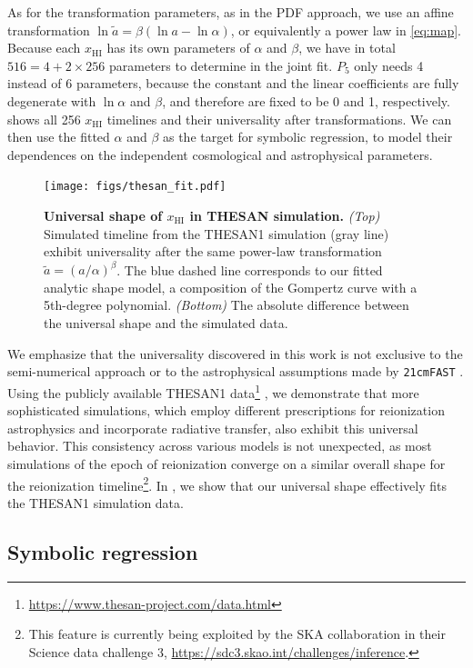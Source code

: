 \documentclass[12pt, a4paper]{article}
\newcommand{\HI}{\mathrm{HI}}
\newcommand{\ap}{\alpha}
\newcommand{\tilt}{\beta}
\newcommand{\ar}{\tilde{a}}
\begin{document}
As for the transformation parameters, as in the PDF approach, we use an
affine transformation $\ln\ar = \tilt (\ln a - \ln\ap)$, or equivalently
a power law in \cref{eq:map}.
Because each $x_\HI$ has its own parameters of $\ap$ and $\tilt$, we
have in total $516 = 4 + 2 \times 256$ parameters to determine in the
joint fit.
$P_5$ only needs 4 instead of 6 parameters, because the constant and the
linear coefficients are fully degenerate with $\ln\ap$ and $\tilt$, and
therefore are fixed to be 0 and 1, respectively.
 shows all 256 $x_\HI$ timelines and their universality
after transformations.
We can then use the fitted $\ap$ and $\tilt$ as the target for symbolic
regression, to model their dependences on the independent cosmological
and astrophysical parameters.

\begin{figure}[tb]
\centering
\texttt{[image: figs/thesan\_fit.pdf]}
\caption{\textbf{Universal shape of $x_\HI$ in THESAN simulation.} 
\emph{(Top)} Simulated timeline from the THESAN1 simulation (gray line) 
exhibit universality after the same power-law transformation 
$\tilde{a} = (a / \alpha)^\beta$. The blue dashed line corresponds to our
fitted analytic shape model, a composition of the Gompertz curve
with a 5th-degree polynomial. \emph{(Bottom)} The absolute difference
between the universal shape and the simulated data. }
\label{fig:thesan}
\end{figure}

We emphasize that the universality discovered in this work is not exclusive
to the semi-numerical approach or to the astrophysical
assumptions made by \texttt{21cmFAST} . Using the publicly available
THESAN1 \cite{Kannan2022} data\footnote{\url{https://www.thesan-project.com/data.html}} ,
we demonstrate that more sophisticated simulations, which employ
different prescriptions for reionization astrophysics and incorporate
radiative transfer, also exhibit this universal behavior. 
This consistency across various models is not unexpected, as most 
simulations of the epoch of reionization converge on a similar overall shape
for the reionization timeline\footnote{This feature is currently being exploited 
by the SKA collaboration in their Science data challenge 3,
\url{https://sdc3.skao.int/challenges/inference}.}. In  , we 
show that our universal shape effectively fits the THESAN1 simulation data.

\subsection*{Symbolic regression}
\label{sec:pysr}
\end{document}

